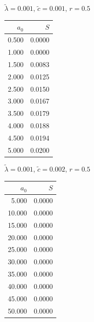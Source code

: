 \documentclass[11pt,a4paper,dvipsnames,twosided]{article}
\begin{document}
\begin{minipage}[t]{\textwidth}
    \begin{minipage}[t]{0.32\textwidth}
        \footnotesize
        \begin{flushleft}$\tilde{\lambda}=0.001$, $\tilde{c}=0.001$, $r=0.5$\end{flushleft}
        \begin{tabular}[t]{rr}
            $a_0$ & $S$ \\
            \hline
             0.500 & 0.0000 \\
             1.000 & 0.0000 \\
             1.500 & 0.0083 \\
             2.000 & 0.0125 \\
             2.500 & 0.0150 \\
             3.000 & 0.0167 \\
             3.500 & 0.0179 \\
             4.000 & 0.0188 \\
             4.500 & 0.0194 \\
             5.000 & 0.0200 \\
        \end{tabular}
    \end{minipage}
    \begin{minipage}[t]{0.32\textwidth}
        \footnotesize
        \begin{flushleft}$\tilde{\lambda}=0.001$, $\tilde{c}=0.002$, $r=0.5$\end{flushleft}
        \begin{tabular}[t]{rr}
            $a_0$ & $S$ \\
            \hline
             5.000 & 0.0000 \\
            10.000 & 0.0000 \\
            15.000 & 0.0000 \\
            20.000 & 0.0000 \\
            25.000 & 0.0000 \\
            30.000 & 0.0000 \\
            35.000 & 0.0000 \\
            40.000 & 0.0000 \\
            45.000 & 0.0000 \\
            50.000 & 0.0000 \\
        \end{tabular}
    \end{minipage}
    \begin{minipage}[t]{0.32\textwidth}

\end{minipage}
\end{minipage}
\end{document}
